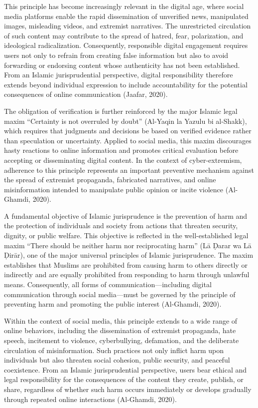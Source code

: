 \documentclass{NSP1}
\begin{document}
This principle has become increasingly relevant in the digital age, where social media platforms enable the rapid dissemination of unverified news, manipulated images, misleading videos, and extremist narratives. The unrestricted circulation of such content may contribute to the spread of hatred, fear, polarization, and ideological radicalization. Consequently, responsible digital engagement requires users not only to refrain from creating false information but also to avoid forwarding or endorsing content whose authenticity has not been established. From an Islamic jurisprudential perspective, digital responsibility therefore extends beyond individual expression to include accountability for the potential consequences of online communication (Jaafar, 2020).

The obligation of verification is further reinforced by the major Islamic legal maxim “Certainty is not overruled by doubt” (Al-Yaqin la Yazulu bi al-Shakk), which requires that judgments and decisions be based on verified evidence rather than speculation or uncertainty. Applied to social media, this maxim discourages hasty reactions to online information and promotes critical evaluation before accepting or disseminating digital content. In the context of cyber-extremism, adherence to this principle represents an important preventive mechanism against the spread of extremist propaganda, fabricated narratives, and online misinformation intended to manipulate public opinion or incite violence (Al-Ghamdi, 2020).

\par\medskip{}\smallskip

A fundamental objective of Islamic jurisprudence is the prevention of harm and the protection of individuals and society from actions that threaten security, dignity, or public welfare. This objective is reflected in the well-established legal maxim “There should be neither harm nor reciprocating harm” (Lā Ḍarar wa Lā Ḍirār), one of the major universal principles of Islamic jurisprudence. The maxim establishes that Muslims are prohibited from causing harm to others directly or indirectly and are equally prohibited from responding to harm through unlawful means. Consequently, all forms of communication—including digital communication through social media—must be governed by the principle of preventing harm and promoting the public interest (Al-Ghamdi, 2020).

Within the context of social media, this principle extends to a wide range of online behaviors, including the dissemination of extremist propaganda, hate speech, incitement to violence, cyberbullying, defamation, and the deliberate circulation of misinformation. Such practices not only inflict harm upon individuals but also threaten social cohesion, public security, and peaceful coexistence. From an Islamic jurisprudential perspective, users bear ethical and legal responsibility for the consequences of the content they create, publish, or share, regardless of whether such harm occurs immediately or develops gradually through repeated online interactions (Al-Ghamdi, 2020).
\end{document}

